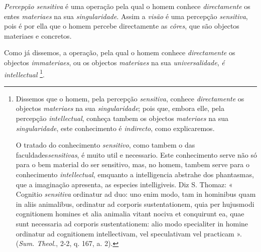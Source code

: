 
\emph{Percepção sensitiva} é uma operação pela qual o homem conhece \emph{directamente} os entes \emph{materiaes} na sua \emph{singularidade}. Assim a \emph{visão} é uma percepção \emph{sensitiva}, pois é por ella que o homem percebe directamente as \emph{côres}, que são objectos materiaes e concretos.

Como já dissemos, a operação, pela qual o homem conhece \emph{directamente} os objectos \emph{immateriaes}, ou os objectos \emph{materiaes} na sua \emph{universalidade}, \emph{é intellectual} \footnote{Dissemos que o homem, pela percepção \emph{sensitiva}, conhece \emph{directamente} os objectos \emph{materiaes} na sua \emph{singularidade}; pois que, embora elle, pela percepção \emph{intellectual}, conheça tambem os objectos \emph{materiaes} na sua \emph{singularidade}, este conhecimento é \emph{indirecto}, como explicaremos.\par O tratado do conhecimento \emph{sensitivo}, como tambem o das faculdades\emph{sensitivas}, é muito util e necessario. Este conhecimento serve não só para o bem material do ser sensitivo, mas, no homem, tambem serve para o conhecimento \emph{intellectual}, emquanto a intelligencia abstrahe dos phantasmas, que a imaginação apresenta, as especies intelligiveis. Diz S. Thomaz: « Cognitio \emph{sensitiva} ordinatur ad duo: uno enim modo, tam in hominibus quam in aliis animalibus, ordinatur ad corporis sustentationem, quia per hujusmodi cognitionem homines et alia animalia vitant nociva et conquirunt ea, quae sunt necessaria ad corporis sustentationem: alio modo specialiter in homine ordinatur ad cognitionem intellectivam, vel speculativam vel practicam ». (\emph{Sum. Theol.}, 2-2, q. 167, a. 2).}.


